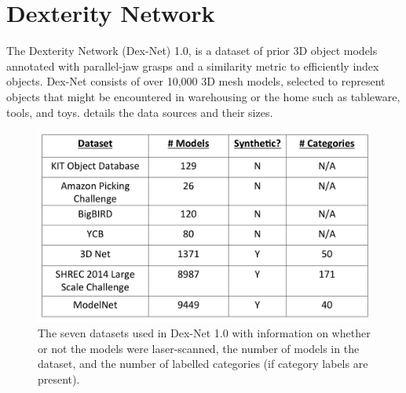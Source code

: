 \section{Dexterity Network}

The Dexterity Network (Dex-Net) 1.0, is a dataset of prior 3D object models annotated with parallel-jaw grasps and a similarity metric to efficiently index objects.
Dex-Net consists of over 10,000 3D mesh models, selected to represent objects that might be encountered in warehousing or the home such as tableware, tools, and toys.
 details the data sources and their sizes.

\begin{figure}[t!]
\centering
\includegraphics[scale=0.1]{figures/dataset_table.jpg}
\caption{The seven datasets used in Dex-Net 1.0 with information on whether or not the models were laser-scanned, the number of models in the dataset, and the number of labelled categories (if category labels are present). }
\vspace*{-15pt}
\end{figure}


